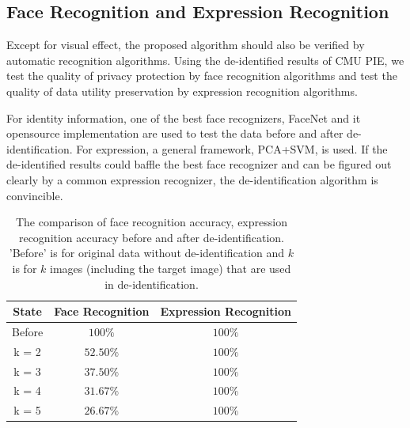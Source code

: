 \subsection{Face Recognition and Expression Recognition}

  Except for visual effect, the proposed algorithm should also be verified by automatic recognition
  algorithms. Using the de-identified results of CMU PIE, we test the quality of privacy protection by face
  recognition algorithms and test the quality of data utility preservation by expression recognition algorithms. 
  

  For identity information, one of the best face recognizers, FaceNet \cite{facenet15} and it opensource 
  implementation \cite{openface16} are used to test the data before and after de-identification. For expression, 
  a general framework, PCA+SVM, is used. If the de-identified results could baffle the best face recognizer and 
  can be figured out clearly by a common expression recognizer, the de-identification algorithm is convincible. 
    \begin{table}[ht]
        \begin{center}
        \begin{tabular}{|c|c|c|}    %
            \hline
            State               & Face Recognition  & Expression Recognition  \\
            \hline
            Before              & $100\%$       & $100\%$           \\
            \hline
            k = 2               & $52.50\%$       & $100\%$           \\
            \hline
            k = 3             & $37.50\%$       & $100\%$           \\
            \hline
            k = 4             & $31.67\%$    & $100\%$           \\
            \hline
            k = 5             & $26.67\%$     & $100\%$           \\
            \hline
        \end{tabular}
        \end{center}
        \caption{The comparison of face recognition accuracy, expression recognition accuracy 
        before and after de-identification. 'Before' is for original data without 
        de-identification and $k$ is for $k$ images (including the target image) that are used in de-identification.}
    \end{table}

